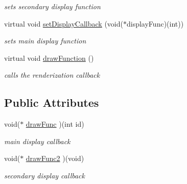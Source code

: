 \begin{DoxyCompactItemize}
\begin{DoxyCompactList}\small\item\em sets secondary display function \end{DoxyCompactList}\item 
\hypertarget{classavr_system_single_a85f602cb791f1e9f6453df363cc1ff6d}{virtual void \hyperlink{classavr_system_single_a85f602cb791f1e9f6453df363cc1ff6d}{set\-Display\-Callback} (void($\ast$display\-Func)(int))}\label{classavr_system_single_a85f602cb791f1e9f6453df363cc1ff6d}

\begin{DoxyCompactList}\small\item\em sets main display function \end{DoxyCompactList}\item 
\hypertarget{classavr_system_single_a6664aa63cfc119ef461de3b24b03bda5}{virtual void \hyperlink{classavr_system_single_a6664aa63cfc119ef461de3b24b03bda5}{draw\-Function} ()}\label{classavr_system_single_a6664aa63cfc119ef461de3b24b03bda5}

\begin{DoxyCompactList}\small\item\em calls the renderization callback \end{DoxyCompactList}\end{DoxyCompactItemize}
\subsection*{Public Attributes}
\begin{DoxyCompactItemize}
\item 
\hypertarget{classavr_system_single_a1b9aa46cfd25de274c7375439ef75339}{void($\ast$ \hyperlink{classavr_system_single_a1b9aa46cfd25de274c7375439ef75339}{draw\-Func} )(int id)}\label{classavr_system_single_a1b9aa46cfd25de274c7375439ef75339}

\begin{DoxyCompactList}\small\item\em main display callback \end{DoxyCompactList}\item 
\hypertarget{classavr_system_single_a7ea216b2e44684e7bec21e8dbdf6f797}{void($\ast$ \hyperlink{classavr_system_single_a7ea216b2e44684e7bec21e8dbdf6f797}{draw\-Func2} )(void)}\label{classavr_system_single_a7ea216b2e44684e7bec21e8dbdf6f797}

\begin{DoxyCompactList}\small\item\em secondary display callback \end{DoxyCompactList}\end{DoxyCompactItemize}
